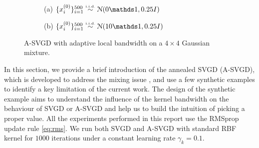 \captionsetup[subfigure]{labelformat=empty}
\begin{figure}[t!]
    \centering 
\begin{subfigure}[b]{.48\textwidth} 
    \caption{(a) $\{x_i^{(0)}\}_{i = 1}^{500} \distiid \distNorm(0\ind, 0.25I)$  \label{fig:bwlocal}}
\end{subfigure}
\hfill
\centering
\begin{subfigure}[b]{0.48\textwidth}
    \caption{(b) $\{x_i^{(0)}\}_{i = 1}^{500} \distiid \distNorm(10\ind, 0.25I)$ \label{fig:slicelocal}}
\end{subfigure}

\caption{A-SVGD with adaptive local bandwidth on a $4 \times 4$ Gaussian mixture.}
\label{fig:gridlocal}
\end{figure}



In this section, we provide a brief introduction of the annealed SVGD (A-SVGD), which is developed to address the mixing issue \citep{d2021annealed}, and use a few synthetic examples to identify a key limitation of the current work. The design of the synthetic example aims to  understand the influence of the kernel bandwidth on the behaviour of SVGD or A-SVGD and help us to build the intuition of picking a proper value. All the experiments performed in this report use the RMSprop update rule \cref{eq:rms}. We run both SVGD and A-SVGD with standard RBF kernel for $1000$ iterations under a constant learning rate $\gamma_k = 0.1$. 



